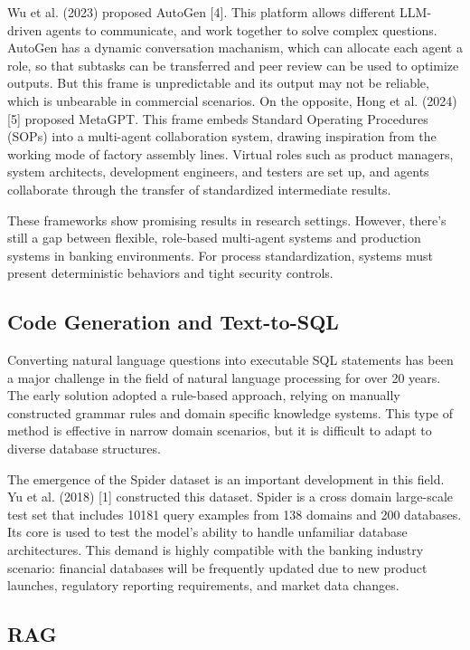 Wu et al. (2023) proposed AutoGen [4]. This platform allows different LLM-driven agents to communicate, and work together to solve complex questions. AutoGen has a dynamic conversation machanism, which can allocate each agent a role, so that subtasks can be transferred and peer review can be used to optimize outputs. But this frame is unpredictable and its output may not be reliable, which is unbearable in commercial scenarios. On the opposite, Hong et al. (2024)[5] proposed MetaGPT. This frame embeds Standard Operating Procedures (SOPs) into a multi-agent collaboration system, drawing inspiration from the working mode of factory assembly lines. Virtual roles such as product managers, system architects, development engineers, and testers are set up, and agents collaborate through the transfer of standardized intermediate results.

These frameworks show promising results in research settings. However, there's still a gap between flexible, role-based multi-agent systems and production systems in banking environments. For process standardization, systems must present deterministic behaviors and tight security controls.

\subsection{Code Generation and Text-to-SQL}

Converting natural language questions into executable SQL statements has been a major challenge in the field of natural language processing for over 20 years. The early solution adopted a rule-based approach, relying on manually constructed grammar rules and domain specific knowledge systems. This type of method is effective in narrow domain scenarios, but it is difficult to adapt to diverse database structures.

The emergence of the Spider dataset is an important development in this field. Yu et al. (2018) [1] constructed this dataset. Spider is a cross domain large-scale test set that includes 10181 query examples from 138 domains and 200 databases. Its core is used to test the model's ability to handle unfamiliar database architectures. This demand is highly compatible with the banking industry scenario: financial databases will be frequently updated due to new product launches, regulatory reporting requirements, and market data changes.

\subsection{RAG}

